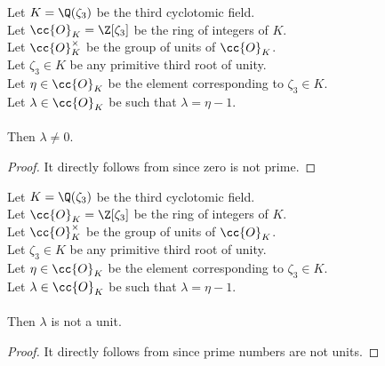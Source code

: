 \begin{lemma}
    \label{lmm:lambda_ne_zero}
    \leanok
    Let $K = \Q(\zeta_3)$ be the third cyclotomic field. \\
    Let $\cc{O}_K = \Z[\zeta_3]$ be the ring of integers of $K$. \\
    Let $\cc{O}^\times_K$ be the group of units of $\cc{O}_K$. \\
    Let $\zeta_3 \in K$ be any primitive third root of unity. \\
    Let $\eta \in \cc{O}_K$ be the element corresponding to $\zeta_3 \in K$. \\
    Let $\lambda \in \cc{O}_K$ be such that $\lambda = \eta -1$. \\\\
    Then $\lambda \neq 0$.
\end{lemma}
\begin{proof}
    \leanok
    It directly follows from  since zero is not prime.
\end{proof}

\begin{lemma}
    \label{lmm:lambda_not_unit}
    \leanok
    Let $K = \Q(\zeta_3)$ be the third cyclotomic field. \\
    Let $\cc{O}_K = \Z[\zeta_3]$ be the ring of integers of $K$. \\
    Let $\cc{O}^\times_K$ be the group of units of $\cc{O}_K$. \\
    Let $\zeta_3 \in K$ be any primitive third root of unity. \\
    Let $\eta \in \cc{O}_K$ be the element corresponding to $\zeta_3 \in K$. \\
    Let $\lambda \in \cc{O}_K$ be such that $\lambda = \eta -1$. \\\\
    Then $\lambda$ is not a unit.
\end{lemma}
\begin{proof}
    \leanok
    It directly follows from  since prime numbers are not units.
\end{proof}

